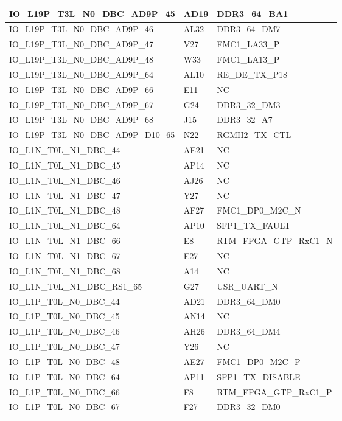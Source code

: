 \begin{footnotesize}
\begin{longtable}{|p{7cm}|p{1cm}|p{5cm}|}
IO\_L19P\_T3L\_N0\_DBC\_AD9P\_45	&	AD19	&	DDR3\_64\_BA1	\\ \hline
IO\_L19P\_T3L\_N0\_DBC\_AD9P\_46	&	AL32	&	DDR3\_64\_DM7	\\ \hline
IO\_L19P\_T3L\_N0\_DBC\_AD9P\_47	&	V27	&	FMC1\_LA33\_P	\\ \hline
IO\_L19P\_T3L\_N0\_DBC\_AD9P\_48	&	W33	&	FMC1\_LA13\_P	\\ \hline
IO\_L19P\_T3L\_N0\_DBC\_AD9P\_64	&	AL10	&	RE\_DE\_TX\_P18	\\ \hline
IO\_L19P\_T3L\_N0\_DBC\_AD9P\_66	&	E11	&	NC	\\ \hline
IO\_L19P\_T3L\_N0\_DBC\_AD9P\_67	&	G24	&	DDR3\_32\_DM3	\\ \hline
IO\_L19P\_T3L\_N0\_DBC\_AD9P\_68	&	J15	&	DDR3\_32\_A7	\\ \hline
IO\_L19P\_T3L\_N0\_DBC\_AD9P\_D10\_65	&	N22	&	RGMII2\_TX\_CTL	\\ \hline
IO\_L1N\_T0L\_N1\_DBC\_44	&	AE21	&	NC	\\ \hline
IO\_L1N\_T0L\_N1\_DBC\_45	&	AP14	&	NC	\\ \hline
IO\_L1N\_T0L\_N1\_DBC\_46	&	AJ26	&	NC	\\ \hline
IO\_L1N\_T0L\_N1\_DBC\_47	&	Y27	&	NC	\\ \hline
IO\_L1N\_T0L\_N1\_DBC\_48	&	AF27	&	FMC1\_DP0\_M2C\_N	\\ \hline
IO\_L1N\_T0L\_N1\_DBC\_64	&	AP10	&	SFP1\_TX\_FAULT	\\ \hline
IO\_L1N\_T0L\_N1\_DBC\_66	&	E8	&	RTM\_FPGA\_GTP\_RxC1\_N	\\ \hline
IO\_L1N\_T0L\_N1\_DBC\_67	&	E27	&	NC	\\ \hline
IO\_L1N\_T0L\_N1\_DBC\_68	&	A14	&	NC	\\ \hline
IO\_L1N\_T0L\_N1\_DBC\_RS1\_65	&	G27	&	USR\_UART\_N	\\ \hline
IO\_L1P\_T0L\_N0\_DBC\_44	&	AD21	&	DDR3\_64\_DM0	\\ \hline
IO\_L1P\_T0L\_N0\_DBC\_45	&	AN14	&	NC	\\ \hline
IO\_L1P\_T0L\_N0\_DBC\_46	&	AH26	&	DDR3\_64\_DM4	\\ \hline
IO\_L1P\_T0L\_N0\_DBC\_47	&	Y26	&	NC	\\ \hline
IO\_L1P\_T0L\_N0\_DBC\_48	&	AE27	&	FMC1\_DP0\_M2C\_P	\\ \hline
IO\_L1P\_T0L\_N0\_DBC\_64	&	AP11	&	SFP1\_TX\_DISABLE	\\ \hline
IO\_L1P\_T0L\_N0\_DBC\_66	&	F8	&	RTM\_FPGA\_GTP\_RxC1\_P	\\ \hline
IO\_L1P\_T0L\_N0\_DBC\_67	&	F27	&	DDR3\_32\_DM0	\\ \hline

\end{longtable}
\end{footnotesize}
